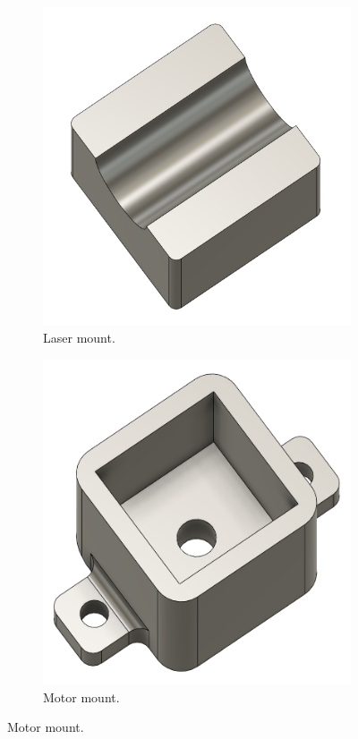 \begin{figure}[!htb]
    \centering
    \begin{subfigure}{0.45\textwidth}
        \includegraphics[width=0.8\linewidth]{figures/hardware_design/laser_mount.png}
        \caption{Laser mount.}
    \end{subfigure}
    \quad
    \begin{subfigure}{0.45\textwidth}
        \includegraphics[width=0.8\linewidth]{figures/hardware_design/motor_mount.png}
        \caption{Motor mount.}
    \end{subfigure}

\end{figure}

